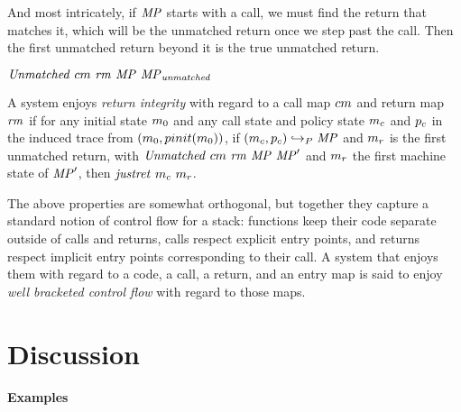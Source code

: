 \documentclass[acmsmall,review,anonymous]{acmart}\settopmatter{printfolios=true,printccs=false,printacmref=false}
\begin{document}
And most intricately, if \(\mathit{MP}\) starts with a call, we must find the
return that matches it, which will be the unmatched return once we
step past the call. Then the first unmatched return beyond it is the
true unmatched return.

            {\(\mathit{Unmatched}\ \callmap\ \retmap\ \MPT\ \MPT_{\mathit{unmatched}}\)}

A system enjoys {\em return integrity} with regard to a call map
\(cm\) and return map \(\mathit{rm}\) if for any initial state
\(m_0\) and any call state and policy state \(m_c\) and
\(p_c\) in the induced trace from
\((m_0,pinit(m_0))\), if \((m_c,p_c)
\hookrightarrow_P \mathit{MP}\) and \(m_r\) is the first unmatched
return, with \(\mathit{Unmatched}\ \callmap\ \retmap\ \MPT \ \MPT'\)
and \(m_r\) the first machine state of \(\mathit{MP}'\), then
\(\mathit{justret}\ m_c\ m_r\).

The above properties are somewhat orthogonal, but together they
capture a standard notion of control flow for a stack: functions keep
their code separate outside of calls and returns, calls respect
explicit entry points, and returns respect implicit entry points
corresponding to their call.  A system that enjoys them with regard to
a code, a call, a return, and an entry map is said to enjoy {\em well
  bracketed control flow} with regard to those maps.

\section{Discussion}
\label{sec:disc}

  \paragraph{Examples}
\end{document}
